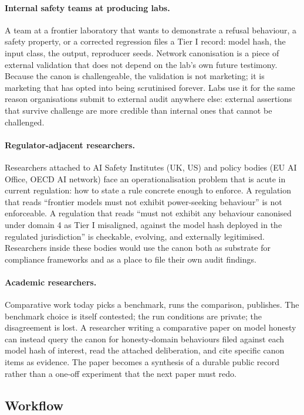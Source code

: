 \documentclass[11pt,a4paper]{article}
\begin{document}
\paragraph{Internal safety teams at producing labs.} A team at a
frontier laboratory that wants to demonstrate a refusal
behaviour, a safety property, or a corrected regression files a
Tier I record: model hash, the input class, the output,
reproducer seeds. Network canonisation is a piece of external
validation that does not depend on the lab's own future
testimony. Because the canon is challengeable, the validation is
not marketing; it is marketing that has opted into being
scrutinised forever. Labs use it for the same reason
organisations submit to external audit anywhere else: external
assertions that survive challenge are more credible than
internal ones that cannot be challenged.

\paragraph{Regulator-adjacent researchers.} Researchers attached
to AI Safety Institutes (UK, US) and policy bodies (EU AI
Office, OECD AI network) face an operationalisation problem
that is acute in current regulation: how to state a rule
concrete enough to enforce. A regulation that reads ``frontier
models must not exhibit power-seeking behaviour'' is not
enforceable. A regulation that reads ``must not exhibit any
behaviour canonised under domain 4 as Tier I misaligned, against
the model hash deployed in the regulated jurisdiction'' is
checkable, evolving, and externally legitimised. Researchers
inside these bodies would use the canon both as substrate for
compliance frameworks and as a place to file their own audit
findings.

\paragraph{Academic researchers.} Comparative work today picks a
benchmark, runs the comparison, publishes. The benchmark choice
is itself contested; the run conditions are private; the
disagreement is lost. A researcher writing a comparative paper
on model honesty can instead query the canon for honesty-domain
behaviours filed against each model hash of interest, read the
attached deliberation, and cite specific canon items as
evidence. The paper becomes a synthesis of a durable public
record rather than a one-off experiment that the next paper
must redo.

\subsection{Workflow}
\end{document}
